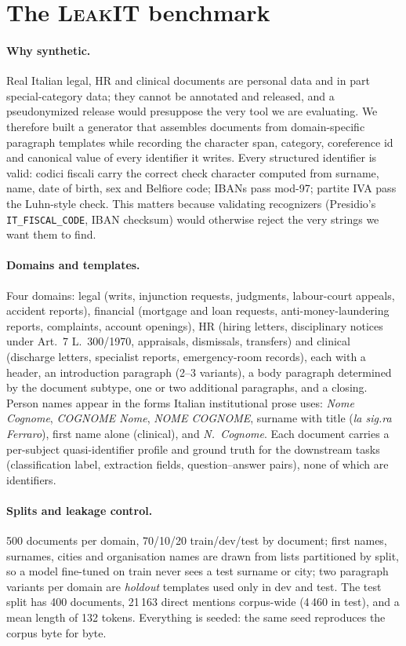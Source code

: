 \documentclass[11pt,a4paper]{article}
\newcommand{\pseud}[1]{\texttt{#1}}
\begin{document}
\section{The \textsc{LeakIT} benchmark}
\label{sec:data}

\paragraph{Why synthetic.} Real Italian legal, HR and clinical documents are personal data and in part special-category data; they cannot be annotated and released, and a pseudonymized release would presuppose the very tool we are evaluating. We therefore built a generator that assembles documents from domain-specific paragraph templates while recording the character span, category, coreference id and canonical value of every identifier it writes. Every structured identifier is valid: codici fiscali carry the correct check character computed from surname, name, date of birth, sex and Belfiore code; IBANs pass mod-97; partite IVA pass the Luhn-style check. This matters because validating recognizers (Presidio's \pseud{IT\_FISCAL\_CODE}, IBAN checksum) would otherwise reject the very strings we want them to find.

\paragraph{Domains and templates.} Four domains: legal (writs, injunction requests, judgments, labour-court appeals, accident reports), financial (mortgage and loan requests, anti-money-laundering reports, complaints, account openings), HR (hiring letters, disciplinary notices under Art.~7 L.~300/1970, appraisals, dismissals, transfers) and clinical (discharge letters, specialist reports, emergency-room records), each with a header, an introduction paragraph (2--3 variants), a body paragraph determined by the document subtype, one or two additional paragraphs, and a closing. Person names appear in the forms Italian institutional prose uses: \emph{Nome Cognome}, \emph{COGNOME Nome}, \emph{NOME COGNOME}, surname with title (\emph{la sig.ra Ferraro}), first name alone (clinical), and \emph{N.~Cognome}. Each document carries a per-subject quasi-identifier profile and ground truth for the downstream tasks (classification label, extraction fields, question--answer pairs), none of which are identifiers.

\paragraph{Splits and leakage control.} 500 documents per domain, 70/10/20 train/dev/test by document; first names, surnames, cities and organisation names are drawn from lists partitioned by split, so a model fine-tuned on train never sees a test surname or city; two paragraph variants per domain are \emph{holdout} templates used only in dev and test. The test split has 400 documents, 21\,163 direct mentions corpus-wide (4\,460 in test), and a mean length of 132 tokens. Everything is seeded: the same seed reproduces the corpus byte for byte.
\end{document}
